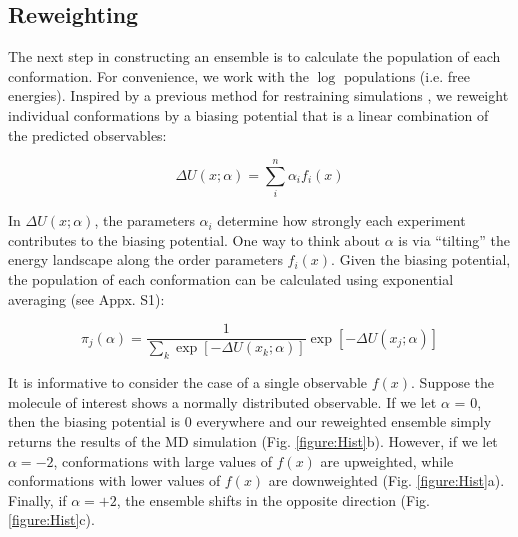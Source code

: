 \documentclass[journal=jacsat,manuscript=article]{achemso}
\begin{document}
\subsection{Reweighting}

The next step in constructing an ensemble is to calculate the population of each conformation.  For convenience, we work with the $\log$ populations (i.e. free energies). Inspired by a previous method for restraining simulations \cite{chodera2012}, we reweight individual conformations by a biasing potential that is a linear combination of the predicted observables:

$$\Delta U(x;\alpha) = \sum_i^n \alpha_i f_i(x)$$

In $\Delta U(x;\alpha)$, the parameters $\alpha_i$ determine how strongly each experiment contributes to the biasing potential.  One way to think about $\alpha$ is via ``tilting'' the energy landscape along the order parameters $f_i(x)$.  Given the biasing potential, the population of each conformation can be calculated using exponential averaging (see Appx. S1):

$$\pi_j(\alpha) = \frac{1}{\sum_k \exp[-\Delta U(x_k;\alpha)]} \exp[-\Delta U(x_j;\alpha)]$$

It is informative to consider the case of a single observable $f(x)$.  Suppose the molecule of interest shows a normally distributed observable.  If we let $\alpha$ = 0, then the biasing potential is $0$ everywhere and our reweighted ensemble simply returns the results of the MD simulation (Fig. \ref{figure:Hist}b).  However, if we let $\alpha = -2$, conformations with large values of $f(x)$ are upweighted, while conformations with lower values of $f(x)$ are downweighted (Fig. \ref{figure:Hist}a).  Finally, if $\alpha = +2$, the ensemble shifts in the opposite direction (Fig. \ref{figure:Hist}c).  
\end{document}
